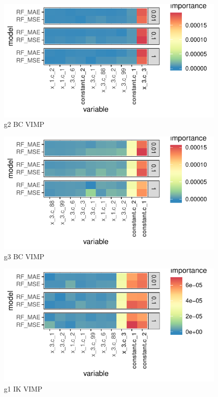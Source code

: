 \documentclass[11pt, a4paper, table]{article}
\begin{document}
\begin{figure}
	\includegraphics[]{../Results/simulation/graphics/simulation_g2_vimp_bc.pdf}
	\caption{g2 BC VIMP}
\end{figure}

\begin{figure}
	\includegraphics[]{../Results/simulation/graphics/simulation_g3_vimp_bc.pdf}
	\caption{g3 BC VIMP}
\end{figure}


\begin{figure}
	\includegraphics[]{../Results/simulation/graphics/simulation_g1_vimp_ik.pdf}
	\caption{g1 IK VIMP}
\end{figure}
\end{document}
